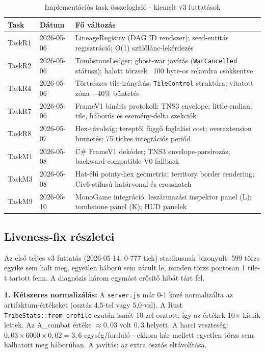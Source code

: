 ﻿\documentclass[a4paper,12pt]{report}
\begin{document}
\begin{table}[h]
\centering
\caption{Implementációs task összefoglaló - kiemelt v3 futtatások}
\label{tab:tasks}
\begin{tabular}{llp{8cm}}
\hline
\textbf{Task} & \textbf{Dátum} & \textbf{Fő változás} \\
\hline
TaskR1 & 2026-05-06 & LineageRegistry (DAG ID rendszer); seed-entitás regisztráció; O(1) szülőlánc-lekérdezés \\
TaskR2 & 2026-05-06 & TombstoneLedger; ghost-war javítás (\texttt{WarCancelled} státusz); halott törzsek ~100 byte-os rekordra csökkentve \\
TaskR4 & 2026-05-06 & Törtrészes tile-irányítás; \texttt{TileControl} struktúra; vitatott zóna $-40\%$ büntetés \\
TaskR7 & 2026-05-06 & FrameV1 bináris protokoll; TNS3 envelope; little-endian; tile, háborús és esemény-delta szekciók \\
TaskR8 & 2026-05-07 & Hex-távolság; tereptől függő foglalási cost; overextension büntetés; 75 tickes integrációs periód \\
TaskM1 & 2026-05-08 & C\# FrameV1 dekóder; TNS3 envelope-parsírozás; backward-compatible V0 fallback \\
TaskM3 & 2026-05-08 & Hat-élű pointy-hex geometria; territory border rendering; Civ6-stílusú határvonal és crosshatch \\
TaskM9 & 2026-05-10 & MonoGame integráció; leszármazási inspektor panel (L); tombstone panel (K); HUD panelek \\
\hline
\end{tabular}
\end{table}

\subsection*{Liveness-fix részletei}

Az első teljes v3 futtatás (2026-05-14, 0-777 tick) statikusnak bizonyult: 599 törzs egyike sem halt meg, egyetlen háború sem zárult le, minden törzs pontosan 1 tile-t tartott fenn. A diagnózis három egymást erősítő hibát tárt fel.

\textbf{1. Kétszeres normalizálás:} A \texttt{server.js} már 0-1 közé normalizálta az artifaktum-értékeket (osztás 4,5-tel vagy 5,0-val). A Rust \texttt{TribeStats::from\_profile} ezután ismét 10-zel osztott, így az értékek 10$\times$ kicsik lettek. Az A\_combat értéke $\approx 0{,}03$ volt $0{,}3$ helyett. A harci veszteség: $0{,}03 \times 6000 \times 0{,}02 = 3{,}6$ egység/forduló - ekkora kár mellett egyetlen törzs sem halhatott meg háborúban. A javítás: az extra osztás eltávolítása.
\end{document}
